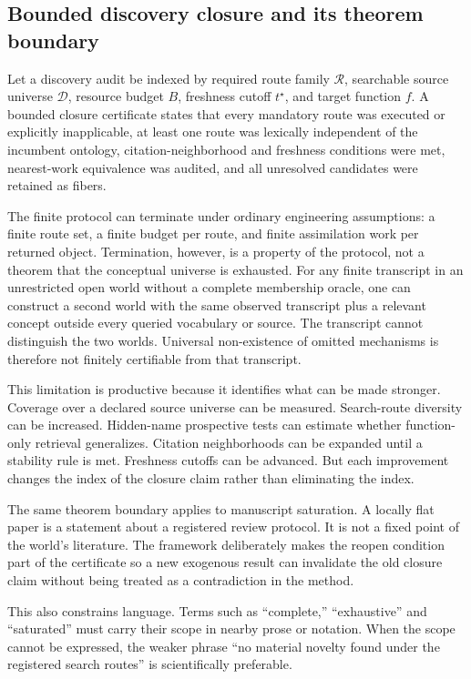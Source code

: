 \subsection{Bounded discovery closure and its theorem boundary}

Let a discovery audit be indexed by required route family \(\mathcal R\), searchable source universe \(\mathcal D\), resource budget \(B\), freshness cutoff \(t^\star\), and target function \(f\). A bounded closure certificate states that every mandatory route was executed or explicitly inapplicable, at least one route was lexically independent of the incumbent ontology, citation-neighborhood and freshness conditions were met, nearest-work equivalence was audited, and all unresolved candidates were retained as fibers.

The finite protocol can terminate under ordinary engineering assumptions: a finite route set, a finite budget per route, and finite assimilation work per returned object. Termination, however, is a property of the protocol, not a theorem that the conceptual universe is exhausted. For any finite transcript in an unrestricted open world without a complete membership oracle, one can construct a second world with the same observed transcript plus a relevant concept outside every queried vocabulary or source. The transcript cannot distinguish the two worlds. Universal non-existence of omitted mechanisms is therefore not finitely certifiable from that transcript.

This limitation is productive because it identifies what can be made stronger. Coverage over a declared source universe can be measured. Search-route diversity can be increased. Hidden-name prospective tests can estimate whether function-only retrieval generalizes. Citation neighborhoods can be expanded until a stability rule is met. Freshness cutoffs can be advanced. But each improvement changes the index of the closure claim rather than eliminating the index.

The same theorem boundary applies to manuscript saturation. A locally flat paper is a statement about a registered review protocol. It is not a fixed point of the world's literature. The framework deliberately makes the reopen condition part of the certificate so a new exogenous result can invalidate the old closure claim without being treated as a contradiction in the method.

This also constrains language. Terms such as ``complete,'' ``exhaustive'' and ``saturated'' must carry their scope in nearby prose or notation. When the scope cannot be expressed, the weaker phrase ``no material novelty found under the registered search routes'' is scientifically preferable.
